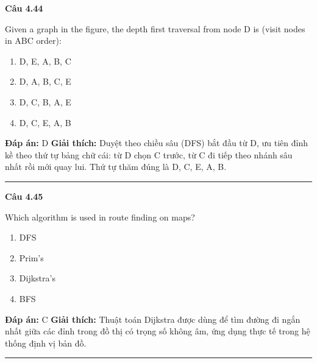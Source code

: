 \documentclass[11pt,a4paper]{article}
\newenvironment{question}[1]{%
  \par\vspace{1em}\noindent\textbf{\large Câu #1}\par\vspace{0.4em}
}{%
  \par\vspace{1em}\hrule\vspace{0.6em}
}
\newenvironment{choices}{%
  \begin{enumerate}[label=\textbf{\Alph*.},leftmargin=2.2em,itemsep=2pt,topsep=3pt]
}{%
  \end{enumerate}
}
\newcommand{\choice}{\item}
\begin{document}
\begin{question}{4.44}
Given a graph in the figure, the depth first traversal from node D is (visit nodes in ABC order):
\begin{center}
\end{center}
\begin{choices}
\choice D, E, A, B, C
\choice D, A, B, C, E
\choice D, C, B, A, E
\choice D, C, E, A, B
\end{choices}
\textbf{Đáp án:} D
\textbf{Giải thích:} Duyệt theo chiều sâu (DFS) bắt đầu từ D, ưu tiên đỉnh kề theo thứ tự bảng chữ cái: từ D chọn C trước, từ C đi tiếp theo nhánh sâu nhất rồi mới quay lui. Thứ tự thăm đúng là D, C, E, A, B.
\end{question}

\begin{question}{4.45}
Which algorithm is used in route finding on maps?
\begin{choices}
\choice DFS
\choice Prim's
\choice Dijkstra's
\choice BFS
\end{choices}
\textbf{Đáp án:} C
\textbf{Giải thích:} Thuật toán Dijkstra được dùng để tìm đường đi ngắn nhất giữa các đỉnh trong đồ thị có trọng số không âm, ứng dụng thực tế trong hệ thống định vị bản đồ.
\end{question}
\end{document}
